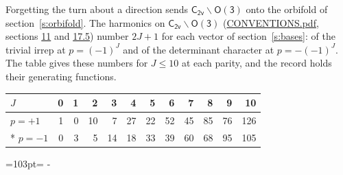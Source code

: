 \documentclass[10pt,a4paper]{article}
\newcommand{\needspace}[1]{\par\penalty-100\begingroup\dimen0=#1\relax\dimen2=\pagegoal
  \advance\dimen2-\pagetotal\ifdim\dimen0>\dimen2\relax\ifdim\dimen2>0pt\vfil\break\fi\fi
  \endgroup}
\numberwithin{equation}{section}
\newcommand{\grp}[1]{\mathsf{#1}}
\begin{document}
Forgetting the turn about a direction sends $\grp{C_{2v}}\backslash\grp{O(3)}$ onto the orbifold of section~\ref{s:orbifold}.
The harmonics on $\grp{C_{2v}}\backslash\grp{O(3)}$ (\href{../../CONVENTIONS.pdf}{CONVENTIONS.pdf}, sections \href{../../CONVENTIONS.pdf\#conv.11}{11} and \href{../../CONVENTIONS.pdf\#conv.17.5}{17.5}) number $2J + 1$ for each vector of section~\ref{s:bases}: of the trivial irrep at $p = (-1)^J$ and of the determinant character at $p = -(-1)^J$. The table gives these numbers for $J \le 10$ at each parity, and the record holds their generating functions.
{\small\setlength{\tabcolsep}{4pt}\begin{longtable}{@{}lrrrrrrrrrrr@{}}\toprule
$J$ & 0 & 1 & 2 & 3 & 4 & 5 & 6 & 7 & 8 & 9 & 10\\\midrule\endhead
\bottomrule\endfoot\endlastfoot
$p = +1$ & 1 & 0 & 10 & 7 & 27 & 22 & 52 & 45 & 85 & 76 & 126\\*
$p = -1$ & 0 & 3 & 5 & 14 & 18 & 33 & 39 & 60 & 68 & 95 & 105\\
\bottomrule\end{longtable}}
\needspace{103pt}
\end{document}
